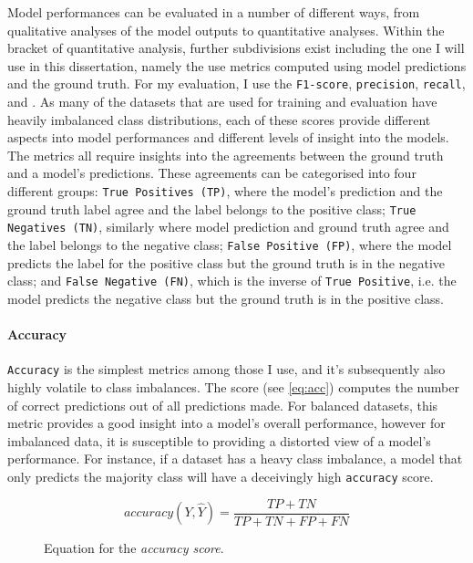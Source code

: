 Model performances can be evaluated in a number of different ways, from qualitative analyses of the model outputs to quantitative analyses. Within the bracket of quantitative analysis, further subdivisions exist including the one I will use in this dissertation, namely the use metrics computed using model predictions and the ground truth.
For my evaluation, I use the \texttt{F1-score}, \texttt{precision}, \texttt{recall}, and . As many of the datasets that are used for training and evaluation have heavily imbalanced class distributions, each of these scores provide different aspects into model performances and different levels of insight into the models.
The metrics all require insights into the agreements between the ground truth and a model's predictions. These agreements can be categorised into four different groups:
\texttt{True Positives (TP)}, where the model's prediction and the ground truth label agree and the label belongs to the positive class; \texttt{True Negatives (TN)}, similarly where model prediction and ground truth agree and the label belongs to the negative class; \texttt{False Positive (FP)}, where the model predicts the label for the positive class but the ground truth is in the negative class; and \texttt{False Negative (FN)}, which is the inverse of \texttt{True Positive}, i.e. the model predicts the negative class but the ground truth is in the positive class.

\paragraph{Accuracy}
\texttt{Accuracy} is the simplest metrics among those I use, and it's subsequently also highly volatile to class imbalances.
The score (see \cref{eq:acc}) computes the number of correct predictions out of all predictions made. For balanced datasets, this metric provides a good insight into a model's overall performance, however for imbalanced data, it is susceptible to providing a distorted view of a model's performance. For instance, if a dataset has a heavy class imbalance, a model that only predicts the majority class will have a deceivingly high \texttt{accuracy} score.

\begin{figure}[h]
  \begin{equation}\label{eq:acc}
    accuracy(Y,\hat{Y}) = \frac{TP + TN}{TP + TN + FP + FN}
  \end{equation}
  \caption{Equation for the \textit{accuracy score}.}
\end{figure}

